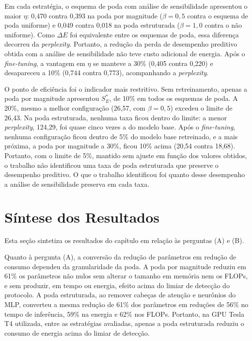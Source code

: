 Em cada estratégia, o esquema de poda com análise de sensibilidade apresentou o maior $\eta$:
0,470 contra 0,393 na poda por magnitude ($\beta = 0{,}5$ contra o esquema de poda uniforme) e
0,049 contra 0,018 na poda estruturada ($\beta = 1{,}0$ contra o não uniforme). Como $\Delta E$
foi equivalente entre os esquemas de poda, essa diferença decorreu
da \textit{perplexity}. Portanto, a redução da perda de desempenho preditivo obtida com a
análise de sensibilidade não teve custo adicional de energia. Após o \textit{fine-tuning}, a
vantagem em $\eta$ se manteve a 30\% (0,405 contra 0,220) e desapareceu a 10\% (0,744 contra
0,773), acompanhando a \textit{perplexity}.

O ponto de eficiência foi o indicador mais restritivo. Sem retreinamento, apenas a poda por
magnitude apresentou $S^*_E$, de 10\% em todos os esquemas de poda. A 20\%, mesmo a melhor
configuração (26,57, com $\beta = 0{,}5$) excedeu o limite de 26,43. Na poda estruturada,
nenhuma taxa ficou dentro do limite: a menor \textit{perplexity}, 124,29, foi quase cinco vezes
a do modelo base. Após o \textit{fine-tuning}, nenhuma
configuração ficou dentro de 5\% do modelo base retreinado, e a mais próxima, a poda por
magnitude a 30\%, ficou 10\% acima (20,54 contra 18,68). Portanto, com o limite de 5\%, mantido
sem ajuste em função dos valores obtidos, o trabalho não identificou uma taxa de poda
estruturada que preserve o desempenho preditivo. O que o trabalho identificou foi quanto desse
desempenho a análise de sensibilidade preserva em cada taxa.

\section{Síntese dos Resultados}\label{sec:res_sintese}

Esta seção sintetiza os resultados do capítulo em relação às perguntas (A) e (B).

Quanto à pergunta (A), a conversão da redução de parâmetros em redução de consumo dependeu da
granularidade da poda. A poda por magnitude reduziu em 61\% os parâmetros não nulos sem alterar
o tamanho em memória nem os FLOPs, e sem produzir, em tempo ou energia, efeito acima do limiar
de detecção do protocolo. A poda estruturada, ao remover cabeças de atenção e neurônios do MLP,
converteu a mesma redução de 61\% dos parâmetros em reduções de 56\% no tempo de inferência,
59\% na energia e 62\% nos FLOPs. Portanto, na GPU Tesla T4 utilizada, entre as estratégias
avaliadas, apenas a poda estruturada reduziu o consumo de energia acima do limiar de detecção.

